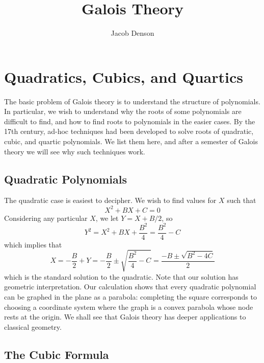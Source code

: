 

\title{Galois Theory}
\author{Jacob Denson}



\maketitle
\tableofcontents

\chapter{Quadratics, Cubics, and Quartics}


The basic problem of Galois theory is to understand the structure of polynomials. In particular, we wish to understand why the roots of some polynomials are difficult to find, and how to find roots to polynomials in the easier cases. By the 17th century, ad-hoc techniques had been developed to solve roots of quadratic, cubic, and quartic polynomials. We list them here, and after a semester of Galois theory we will see why such techniques work.

\section{Quadratic Polynomials}

The quadratic case is easiest to decipher. We wish to find values for $X$ such that
%
\[ X^2 + BX + C  = 0 \]
%
Considering any particular $X$, we let $Y = X + B/2$, so
%
\[ Y^2 = X^2 + BX + \frac{B^2}{4} = \frac{B^2}{4} - C \]
%
which implies that
%
\[ X = -\frac{B}{2} + Y = -\frac{B}{2} \pm \sqrt{\frac{B^2}{4} - C} = \frac{-B \pm \sqrt{B^2 - 4C}}{2} \]
%
which is the standard solution to the quadratic. Note that our solution has geometric interpretation. Our calculation shows that every quadratic polynomial can be graphed in the plane as a parabola: completing the square corresponds to choosing a coordinate system where the graph is a convex parabola whose node rests at the origin. We shall see that Galois theory has deeper applications to classical geometry.

\section{The Cubic Formula}

